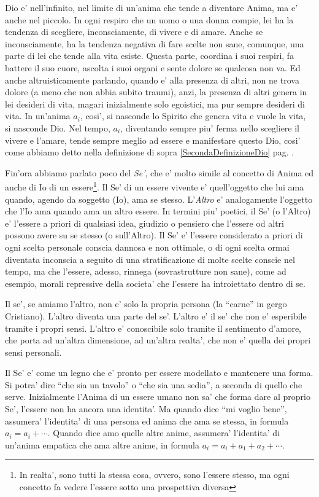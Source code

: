 Dio e' nell'infinito, nel limite di un'anima che tende a diventare Anima, ma e' anche nel piccolo.
 In ogni respiro che un uomo o una donna compie, lei ha la tendenza di scegliere, inconsciamente, di vivere e di amare. Anche se inconsciamente, ha la tendenza negativa di fare scelte non sane, comunque, una parte di lei che tende alla vita esiste. Questa parte, coordina i suoi respiri, fa battere il suo cuore, ascolta i suoi organi e sente dolore se qualcosa non va. Ed anche altruisticamente parlando, quando e' alla presenza di altri, non ne trova dolore (a meno che non abbia subito traumi), anzi, la presenza di altri genera in lei desideri di vita, magari inizialmente solo egoistici, ma pur sempre desideri di vita.
In un'anima $a_i$, cosi', si nasconde lo Spirito che genera vita e vuole la vita, si nasconde Dio. Nel tempo, $a_i$, diventando sempre piu' ferma nello scegliere il vivere e l'amare, tende sempre meglio ad essere e manifestare questo Dio, cosi' come abbiamo detto nella definizione di sopra \ref{SecondaDefinizioneDio} pag. \pageref{SecondaDefinizioneDio}.


Fin'ora abbiamo parlato poco del \emph{Se'}, che e' molto simile al concetto di Anima ed anche di Io di un essere\footnote{In realta', sono tutti la stessa cosa, ovvero, sono l'essere stesso, ma ogni concetto fa vedere l'essere sotto una prospettiva diversa}. Il Se' di un essere vivente e' quell'oggetto che lui ama quando, agendo da soggetto (Io), ama se stesso. L'\emph{Altro} e' analogamente l'oggetto che l'Io ama quando ama un altro essere. In termini piu' poetici, il Se' (o l'Altro) e' l'essere a priori di qualsiasi idea, giudizio o pensiero che l'essere od altri possono avere su se stesso (o sull'Altro). Il Se' e' l'essere considerato a priori di ogni scelta personale conscia dannosa e non ottimale, o di ogni scelta ormai diventata inconscia a seguito di una stratificazione di molte scelte conscie nel tempo, ma che l'essere, adesso, rinnega (sovrastrutture non sane), come ad esempio, morali repressive della societa' che l'essere ha introiettato dentro di se. 

Il se', se amiamo l'altro, non e' solo la propria persona (la ``carne'' in gergo Cristiano). L'altro diventa una parte del se'. L'altro e' il se' che non e' esperibile tramite i propri sensi. L'altro e' conoscibile solo tramite il sentimento d'amore, che porta ad un'altra dimensione, ad un'altra realta', che non e' quella dei propri sensi personali. 

Il Se' e' come un legno che e' pronto per essere modellato e mantenere una forma. Si potra' dire ``che sia un tavolo'' o ``che sia una sedia'', a seconda di quello che serve.  Inizialmente l'Anima di un essere umano non sa' che forma dare al proprio Se', l'essere non ha ancora una identita'. Ma quando dice ``mi voglio bene'', assumera' l'identita' di una persona ed anima che ama se stessa, in formula $a_i=a_i+\cdots$. Quando dice amo quelle altre anime, assumera' l'identita' di un'anima empatica che ama altre anime, in formula $a_i=a_i+a_1+a_2+\cdots$. 

